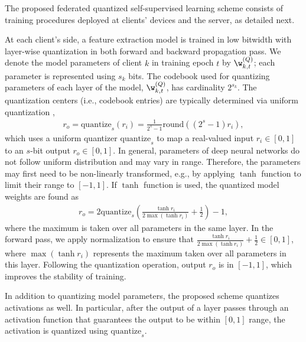 The proposed federated quantized self-supervised learning scheme consists of training procedures deployed at clients' devices and the server, as detailed next.

At each client's side, a feature extraction model is trained in low bitwidth with layer-wise quantization in both forward and backward propagation pass. We denote the model parameters of client $k$ in training epoch $t$ by $\w^{(Q)}_{k, t}$; each parameter is represented using  $s_k$ bits. The codebook used for quantizing parameters of each layer of the model, $\w^{(Q)}_{k, t}$, has cardinality $2^{s_k}$. The quantization centers (i.e., codebook entries) are typically determined via uniform quantization \cite{zhou2016dorefa},
\begin{align*}
     r_o = \mathrm{quantize}_s(r_i) =  \frac{1}{2^s-1}\mathrm{round}((2^s-1)r_i),
\end{align*}
which uses a uniform quantizer $\mathrm{quantize}_s$ to map a real-valued input $r_i \in [0, 1]$ to an $s$-bit output $r_o \in [0, 1]$. In general, parameters of deep neural networks do not follow uniform distribution and may vary in range. Therefore, the parameters may first need to be non-linearly transformed, e.g., by applying $\tanh$ function to limit their range to $[-1, 1]$. If $\tanh$ function is used, the quantized model weights are found as
\begin{align*}
     r_o = 2\mathrm{quantize}_s(\frac{\tanh{r_i}}{2\max(\tanh{r_i})}+\frac{1}{2}) - 1, 
\end{align*}
where the maximum is taken over all parameters in the same layer. In the forward pass, we apply normalization to ensure that $\frac{\tanh{r_i}}{2\max(\tanh{r_i})}+\frac{1}{2} \in [0, 1] $, where $\max(\tanh{r_i})$ represents the maximum taken over all parameters in this layer. Following the quantization operation, output $r_o$ is in $[-1, 1]$, which improves the stability of training.

In addition to quantizing model parameters, the proposed scheme quantizes activations as well. In particular, after the output of a layer passes through an activation function that guarantees the output to be within $[0, 1]$ range, the activation is quantized using $\mathrm{quantize}_s$. 

